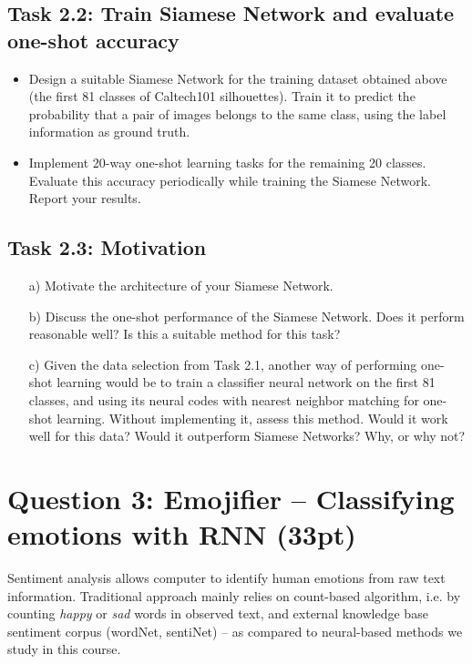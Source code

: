 \documentclass[a4paper,twoside,10pt]{article}
\begin{document}
\subsection*{Task 2.2: Train Siamese Network and evaluate one-shot accuracy}
\begin{itemize}
  \item Design a suitable Siamese Network for the training dataset obtained above (the first 81 classes of Caltech101 silhouettes). Train it to predict the probability that a pair of images belongs to the same class, using the label information as ground truth.
  \item Implement 20-way one-shot learning tasks for the remaining 20 classes. Evaluate this accuracy periodically while training the Siamese Network. Report your results.
\end{itemize}

\subsection*{Task 2.3: Motivation}
\begin{itemize}
  \item[a)] Motivate the architecture of your Siamese Network.
  \item[b)] Discuss the one-shot performance of the Siamese Network. Does it perform reasonable well? Is this a suitable method for this task?
  \item[c)] Given the data selection from Task 2.1, another way of performing one-shot learning would be to train a classifier neural network on the first 81 classes, and using its neural codes with nearest neighbor matching for one-shot learning. Without implementing it, assess this method. Would it work well for this data? Would it outperform Siamese Networks? Why, or why not?
\end{itemize}

\section*{Question 3: Emojifier -- Classifying emotions with RNN (33pt)}

Sentiment analysis allows computer to identify human emotions from raw text information. Traditional approach mainly relies on count-based algorithm, i.e. by counting \textit{happy} or \textit{sad} words in observed text, and external knowledge base sentiment corpus (wordNet, sentiNet) -- as compared to neural-based methods we study in this course. 
\end{document}
